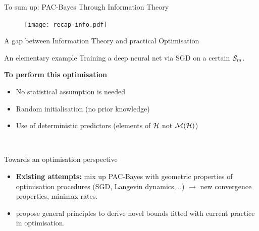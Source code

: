 \documentclass{presentation}
\begin{document}
\begin{xframe}{To sum up: PAC-Bayes Through Information Theory }
    \begin{figure}
        \centering
        \texttt{[image: recap-info.pdf]}
    \end{figure}
  \end{xframe}

\begin{xframe}{A gap between Information Theory and practical Optimisation}
    \begin{block}{An elementary example}
        Training a deep neural net via SGD on a certain $\mathcal{S}_m$.
    \end{block}
\vspace{0.5cm}
{\bf To perform this optimisation}
    \begin{itemize}
        \item No statistical assumption is needed
        \item Random initialisation (no prior knowledge)
        \item Use of deterministic predictors (elements of $\mathcal{H}$ not $\mathcal{M}(\mathcal{H})$)
    \end{itemize}
    \vspace{0.5cm}
    \\
    \vspace{0.5cm}
\end{xframe}

\begin{xframe}{Towards an optimisation perspective}
    \vspace{1cm}
    \begin{itemize}
        \item \textbf{Existing attempts:} mix up PAC-Bayes with geometric properties of optimisation procedures (SGD, Langevin dynamics,...)  \citep{london2017pac,dziugaite2018entropy,neu2021info,clerico2022generalisation,haghifam2023limit,zhou2023toward} $\rightarrow$ new convergence properties, minimax rates.
        \item {} propose general principles to derive novel bounds fitted with current practice in optimisation.
    \end{itemize}
    \vspace{0.5cm}



\end{xframe}
\end{document}
